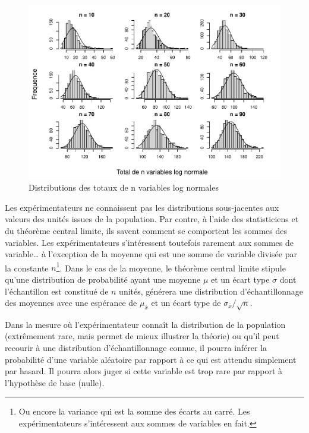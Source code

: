 \documentclass[
]{book}
\begin{document}
\begin{figure}
\centering
\includegraphics{08-Inferer_files/figure-latex/testn-1.pdf}
\caption{\label{fig:testn}Distributions des totaux de n variables log normales}
\end{figure}

Les expérimentateurs ne connaissent pas les distributions sous-jacentes aux valeurs des unités issues de la population. Par contre, à l'aide des statisticiens et du théorème central limite, ils savent comment se comportent les sommes des variables. Les expérimentateurs s'intéressent toutefois rarement aux sommes de variable\ldots{} à l'exception de la moyenne qui est une somme de variable divisée par la constante \(n\)\footnote{Ou encore la variance qui est la somme des écarts au carré. Les expérimentateurs s'intéressent aux sommes de variables en fait.}. Dans le cas de la moyenne, le théorème central limite stipule qu'une distribution de probabilité ayant une moyenne \(\mu\) et un écart type \(\sigma\) dont l'échantillon est constitué de \(n\) unités, générera une distribution d'échantillonnage des moyennes avec une espérance de \(\mu_{\bar{x}}\) et un écart type de \(\sigma_{\bar{x}}/\sqrt{n}\).

Dans la mesure où l'expérimentateur connaît la distribution de la population (extrêmement rare, mais permet de mieux illustrer la théorie) ou qu'il peut recourir à une distribution d'échantillonnage connue, il pourra inférer la probabilité d'une variable aléatoire par rapport à ce qui est attendu simplement par hasard. Il pourra alors juger si cette variable est trop rare par rapport à l'hypothèse de base (nulle).
\end{document}
